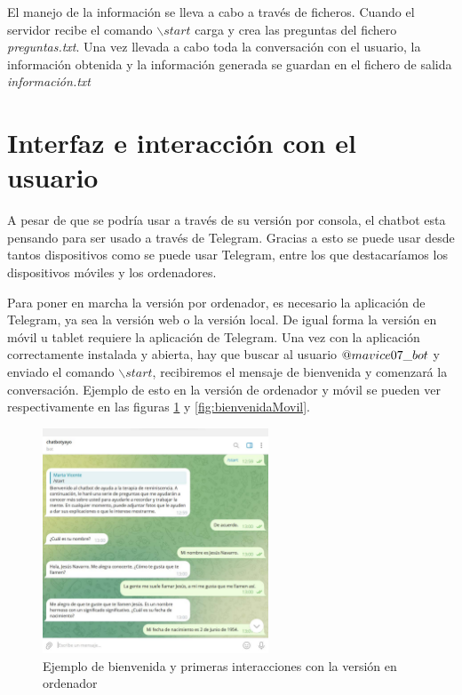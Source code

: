 El manejo de la información se lleva a cabo a través de ficheros. Cuando el servidor recibe el comando $\backslash start$ carga y crea las preguntas del fichero \textit{preguntas.txt}. Una vez llevada a cabo toda la conversación con el usuario, la información obtenida y la información generada se guardan en el fichero de salida \textit{información.txt}

\section{Interfaz e interacción con el usuario}
A pesar de que se podría usar a través de su versión por consola, el chatbot esta pensando para ser usado a través de Telegram. Gracias a esto se puede usar desde tantos dispositivos como se puede usar Telegram, entre los que destacaríamos los dispositivos móviles y los ordenadores.

Para poner en marcha la versión por ordenador, es necesario la aplicación de Telegram, ya sea la versión web o la versión local. De igual forma la versión en móvil u tablet requiere la aplicación de Telegram. Una vez con la aplicación correctamente instalada y abierta, hay que buscar al usuario $\makeatletter @ mavice07\_bot$ y enviado el comando  $\backslash start$, recibiremos el mensaje de bienvenida y comenzará la conversación. Ejemplo de esto en la versión de ordenador y móvil se pueden ver respectivamente en las figuras \ref{fig:bienvenidaOrdenador} y \ref{fig:bienvenidaMovil}.

\begin{figure}[h]
	\centering
	\includegraphics[width=0.6\textwidth]{Imagenes/bienvenidaOrdenador}
	\caption{Ejemplo de bienvenida y primeras interacciones con la versión en ordenador}
	\label{fig:bienvenidaOrdenador}
\end{figure}

